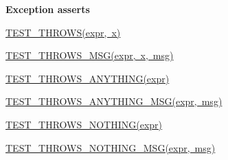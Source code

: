 {\bfseries Exception asserts}
\begin{DoxyItemize}
\item \mbox{\hyperlink{cpptest-assert_8h_a5174c5f93519d5726c8993b2f36d6ceb}{T\+E\+S\+T\+\_\+\+T\+H\+R\+O\+W\+S(expr, x)}}
\item \mbox{\hyperlink{cpptest-assert_8h_a1ce6abe9e9134ce993840a648673e0f2}{T\+E\+S\+T\+\_\+\+T\+H\+R\+O\+W\+S\+\_\+\+M\+S\+G(expr, x, msg)}}
\item \mbox{\hyperlink{cpptest-assert_8h_a895af88056cd626a010136ac07b81d37}{T\+E\+S\+T\+\_\+\+T\+H\+R\+O\+W\+S\+\_\+\+A\+N\+Y\+T\+H\+I\+N\+G(expr)}}
\item \mbox{\hyperlink{cpptest-assert_8h_a052597a8fd7dbc40ba350c735c4517c5}{T\+E\+S\+T\+\_\+\+T\+H\+R\+O\+W\+S\+\_\+\+A\+N\+Y\+T\+H\+I\+N\+G\+\_\+\+M\+S\+G(expr, msg)}}
\item \mbox{\hyperlink{cpptest-assert_8h_a885a5f6b6decac47414b4cc1a0a66425}{T\+E\+S\+T\+\_\+\+T\+H\+R\+O\+W\+S\+\_\+\+N\+O\+T\+H\+I\+N\+G(expr)}}
\item \mbox{\hyperlink{cpptest-assert_8h_a758a47b613522a3d597c513786191ff9}{T\+E\+S\+T\+\_\+\+T\+H\+R\+O\+W\+S\+\_\+\+N\+O\+T\+H\+I\+N\+G\+\_\+\+M\+S\+G(expr, msg)}} 
\end{DoxyItemize}